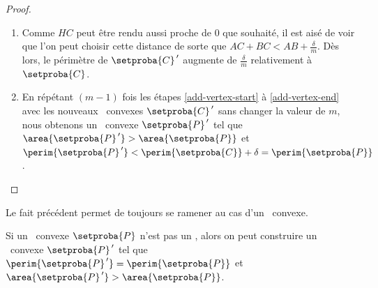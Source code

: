 \begin{proof}
\begin{enumerate}
		\item \label{add-vertex-end}
		Comme $HC$ peut être rendu aussi proche de $0$ que souhaité, il est aisé de voir que l'on peut choisir cette distance de sorte que $AC + BC < AB + \frac{\delta}{m}$.
		Dès lors, le périmètre de $\setproba{C}^{\,\prime}$ augmente de $\frac{\delta}{m}$ relativement à $\setproba{C}$.

		\item En répétant $(m-1)$ fois les étapes \ref{add-vertex-start} à \ref{add-vertex-end} avec les nouveaux \ngones\ convexes $\setproba{C}^{\,\prime}$ sans changer la valeur de $m$, nous obtenons un \ngone\ convexe $\setproba{P}^{\,\prime}$ tel que
		$\area{\setproba{P}^{\,\prime}} > \area{\setproba{P}}$
		et
		$\perim{\setproba{P}^{\,\prime}} < \perim{\setproba{C}} + \delta = \perim{\setproba{P}}$.
	\end{enumerate}
\end{proof}


\begin{remark}
	Le fait précédent permet de toujours se ramener au cas d'un \ngone\ convexe.
\end{remark}




\begin{fact} \label{iso-poly} 
	Si un \ngone\ convexe $\setproba{P}$ n'est pas un \niso, alors on peut construire un \ngone\ convexe $\setproba{P}^{\,\prime}$ tel que 
	$\perim{\setproba{P}^{\,\prime}} = \perim{\setproba{P}}$ 
	et 
	$\area{\setproba{P}^{\,\prime}} > \area{\setproba{P}}$.
\end{fact}



